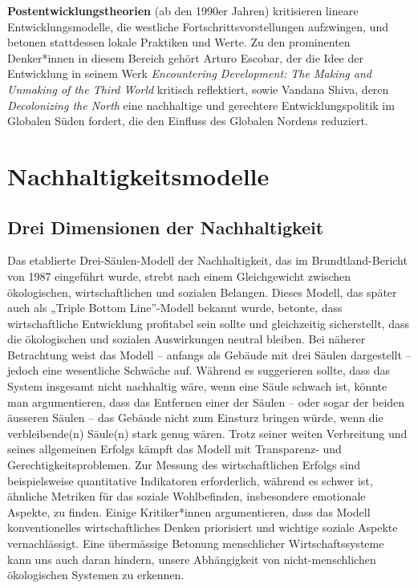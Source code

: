 \documentclass[
  nswissgerman,
  a4paper,
  DIV=11,
  numbers=noendperiod,
  oneside,
  openany]{scrreprt}
\begin{document}
\begin{tcolorbox}
\textbf{Postentwicklungstheorien} (ab den 1990er Jahren) kritisieren
lineare Entwicklungsmodelle, die westliche Fortschrittsvorstellungen
aufzwingen, und betonen stattdessen lokale Praktiken und Werte. Zu den
prominenten Denker*innen in diesem Bereich gehört Arturo Escobar, der
die Idee der Entwicklung in seinem Werk \emph{Encountering Development:
The Making and Unmaking of the Third World} kritisch reflektiert, sowie
Vandana Shiva, deren \emph{Decolonizing the North} eine nachhaltige und
gerechtere Entwicklungspolitik im Globalen Süden fordert, die den
Einfluss des Globalen Nordens reduziert.

\end{tcolorbox}

\section{Nachhaltigkeitsmodelle}\label{nachhaltigkeitsmodelle}

\subsection{Drei Dimensionen der
Nachhaltigkeit}\label{drei-dimensionen-der-nachhaltigkeit}

Das etablierte Drei-Säulen-Modell der Nachhaltigkeit, das im
Brundtland-Bericht von 1987 eingeführt wurde, strebt nach einem
Gleichgewicht zwischen ökologischen, wirtschaftlichen und sozialen
Belangen. Dieses Modell, das später auch als „Triple Bottom
Line''-Modell bekannt wurde, betonte, dass wirtschaftliche Entwicklung
profitabel sein sollte und gleichzeitig sicherstellt, dass die
ökologischen und sozialen Auswirkungen neutral bleiben. Bei näherer
Betrachtung weist das Modell -- anfangs als Gebäude mit drei Säulen
dargestellt -- jedoch eine wesentliche Schwäche auf. Während es
suggerieren sollte, dass das System insgesamt nicht nachhaltig wäre,
wenn eine Säule schwach ist, könnte man argumentieren, dass das
Entfernen einer der Säulen -- oder sogar der beiden äusseren Säulen --
das Gebäude nicht zum Einsturz bringen würde, wenn die verbleibende(n)
Säule(n) stark genug wären. Trotz seiner weiten Verbreitung und seines
allgemeinen Erfolgs kämpft das Modell mit Transparenz- und
Gerechtigkeitsproblemen. Zur Messung des wirtschaftlichen Erfolgs sind
beispielsweise quantitative Indikatoren erforderlich, während es schwer
ist, ähnliche Metriken für das soziale Wohlbefinden, insbesondere
emotionale Aspekte, zu finden. Einige Kritiker*innen argumentieren, dass
das Modell konventionelles wirtschaftliches Denken priorisiert und
wichtige soziale Aspekte vernachlässigt. Eine übermässige Betonung
menschlicher Wirtschaftssysteme kann uns auch daran hindern, unsere
Abhängigkeit von nicht-menschlichen ökologischen Systemen zu erkennen.
\end{document}
